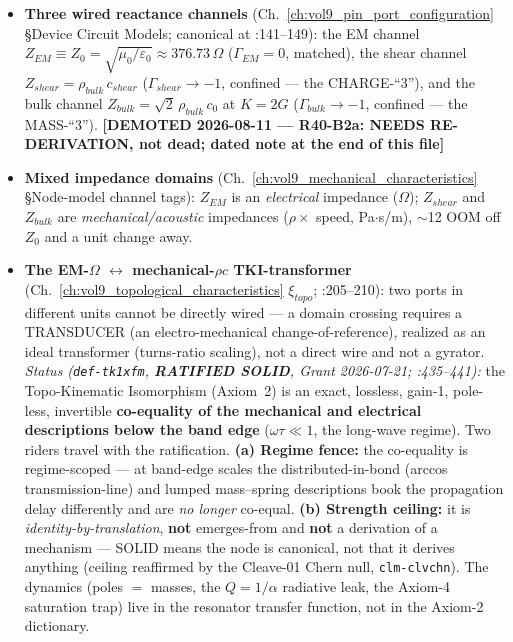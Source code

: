 \begin{itemize}
    \item \textbf{Three wired reactance channels} (Ch.~\ref{ch:vol9_pin_port_configuration} \S Device Circuit Models; canonical at :141--149): the EM channel $Z_{EM} \equiv Z_0 = \sqrt{\mu_0/\varepsilon_0} \approx 376.73\,\Omega$ ($\Gamma_{EM} = 0$, matched), the shear channel $Z_{shear} = \rho_{bulk}\, c_{shear}$ ($\Gamma_{shear} \to -1$, confined --- the CHARGE-``3''), and the bulk channel $Z_{bulk} = \sqrt{2}\,\rho_{bulk}\, c_0$ at $K = 2G$ ($\Gamma_{bulk} \to -1$, confined --- the MASS-``3''). \textbf{[DEMOTED 2026-08-11 --- R40-B2a: NEEDS RE-DERIVATION, not dead; dated note at the end of this file]}
    \item \textbf{Mixed impedance domains} (Ch.~\ref{ch:vol9_mechanical_characteristics} \S Node-model channel tags): $Z_{EM}$ is an \emph{electrical} impedance ($\Omega$); $Z_{shear}$ and $Z_{bulk}$ are \emph{mechanical/acoustic} impedances ($\rho \times$ speed, Pa$\cdot$s/m), $\sim$12 OOM off $Z_0$ and a unit change away.
    \item \textbf{The EM-$\Omega$ $\leftrightarrow$ mechanical-$\rho c$ TKI-transformer} (Ch.~\ref{ch:vol9_topological_characteristics} $\xi_{topo}$; :205--210): two ports in different units cannot be directly wired --- a domain crossing requires a TRANSDUCER (an electro-mechanical change-of-reference), realized as an ideal transformer (turns-ratio scaling), not a direct wire and not a gyrator. \emph{Status (\texttt{def-tk1xfm}, \textbf{RATIFIED SOLID}, Grant 2026-07-21; :435--441):} the Topo-Kinematic Isomorphism (Axiom~2) is an exact, lossless, gain-1, pole-less, invertible \textbf{co-equality of the mechanical and electrical descriptions below the band edge} ($\omega\tau \ll 1$, the long-wave regime). Two riders travel with the ratification. \textbf{(a) Regime fence:} the co-equality is regime-scoped --- at band-edge scales the distributed-in-bond (arccos transmission-line) and lumped mass--spring descriptions book the propagation delay differently and are \emph{no longer} co-equal. \textbf{(b) Strength ceiling:} it is \emph{identity-by-translation}, \textbf{not} emerges-from and \textbf{not} a derivation of a mechanism --- SOLID means the node is canonical, not that it derives anything (ceiling reaffirmed by the Cleave-01 Chern null, \texttt{clm-clvchn}). The dynamics (poles $=$ masses, the $Q = 1/\alpha$ radiative leak, the Axiom-4 saturation trap) live in the resonator transfer function, not in the Axiom-2 dictionary.

\end{itemize}

